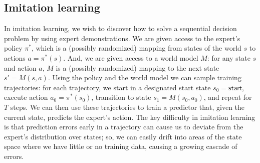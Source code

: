 \documentclass[twoside,11pt]{article}
\begin{document}

\subsection{Imitation learning}

In imitation learning, we wish to discover how to solve a sequential decision problem by using expert demonstrations.  We are given access to the expert's policy $\pi^*$, which is a (possibly randomized) mapping from states of the world $s$ to actions $a=\pi^*(s)$. And, we are given access to a world model $M$: for any state $s$ and action $a$, $M$ is a (possibly randomized) mapping to the next state $s'=M(s,a)$.
Using the policy and the world model we can sample training trajectories: for each trajectory, we start in a designated start state $s_0=\textsf{start}$, execute action $a_0=\pi^*(s_0)$, transition to state $s_1=M(s_0,a_0)$, and repeat for $T$ steps.  We can then use these trajectories to train a predictor that, given the current state, predicts the expert's action.
The key difficulty in imitation learning is that prediction errors early in a trajectory can cause us to deviate from the expert's distribution over states; so, we can easily drift into areas of the state space where we have little or no training data, causing a growing cascade of errors.
\end{document}
